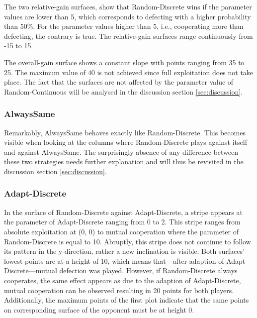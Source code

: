 \documentclass[11pt]{article}
\begin{document}
		The two relative-gain surfaces, show that Random-Discrete wins if the parameter values are lower than 5, which corresponds to defecting with a higher probability than 50\%.
		For the parameter values higher than 5, i.e., cooperating more than defecting, the contrary is true.
		The relative-gain surfaces range continuously from -15 to 15.

		The overall-gain surface shows a constant slope with points ranging from 35 to 25.
		The maximum value of 40 is not achieved since full exploitation does not take place.
		The fact that the surfaces are not affected by the parameter value of Random-Continuous will be analysed in the discussion section \ref{sec:discussion}.

\subsubsection*{AlwaysSame}
		Remarkably, AlwaysSame behaves exactly like Random-Discrete.
		This becomes visible when looking at the columns where Random-Discrete plays against itself and against AlwaysSame.
		The surprisingly absence of any difference between these two strategies needs further explanation and will thus be revisited in the discussion section \ref{sec:discussion}.

\subsubsection*{Adapt-Discrete}
		In the surface of Random-Discrete against Adapt-Discrete, a stripe appears at the parameter of Adapt-Discrete ranging from 0 to 2.
		This stripe ranges from absolute exploitation at (0, 0) to mutual cooperation where the parameter of Random-Discrete is equal to 10.
		Abruptly, this stripe does not continue to follow its pattern in the y-direction, rather a new inclination is visible.
		Both surfaces' lowest points are at a height of 10, which means that---after adaption of Adapt-Discrete---mutual defection was played.
		However, if Random-Discrete always cooperates, the same effect appears as due to the adaption of Adapt-Discrete, mutual cooperation can be observed resulting in 20 points for both players. 
		Additionally, the maximum points of the first plot indicate that the same points on corresponding surface of the opponent must be at height 0.
\end{document}
